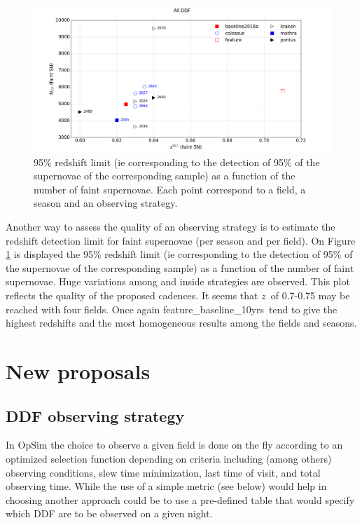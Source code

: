 \documentclass [11pt,a4paper]{article}
\newcommand{\feature}{feature\_baseline\_10yrs}
\newcommand{\redshift}{$z$}
\begin{document}
\begin{figure}[htbp]
\begin{center}
  
  \includegraphics[width=15cm]{Figures/Z95_NSN.png}
 \caption{95\% redshift limit (ie corresponding to the detection of 95\% of the supernovae of the corresponding sample) as a function of the number of faint supernovae. Each point correspond to a field, a season and an observing strategy.}\label{fig:z95}
\end{center}
\end{figure}

Another way to assess the quality of an observing strategy is to estimate the redshift detection limit for faint supernovae (per season and per field). On Figure \ref{fig:z95} is displayed the 95\% redshift limit (ie corresponding to the detection of 95\% of the supernovae of the corresponding sample) as a function of the number of faint supernovae. Huge variations among and inside strategies are observed. This plot reflects the quality of the proposed cadences. It seems that \redshift~of 0.7-0.75 may be reached with four fields. Once again \feature~tend to give the highest redshifts and the most homogeneous results among the fields and seasons. 

\section{New proposals}

\subsection{DDF observing strategy}

In OpSim the choice to observe a given field is done on the fly according to an optimized selection function depending on criteria including (among others) observing conditions, slew time minimization, last time of visit, and total observing time. While the use of a simple metric (see below) would help in choosing another approach could be to use a pre-defined table that would specify which DDF are to be observed on a given night.
\end{document}
